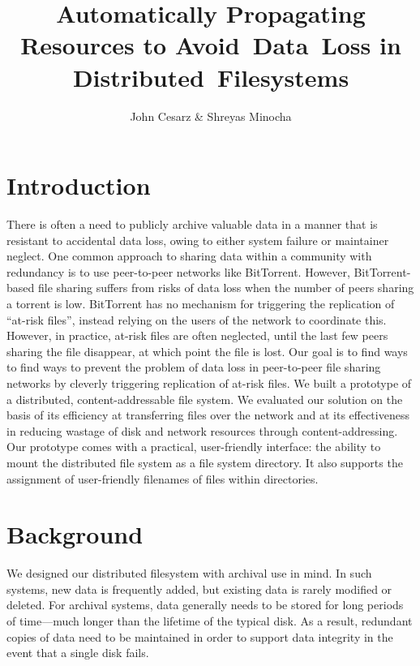 \documentclass[twocolumn]{article}
\title{Automatically Propagating Resources to Avoid~Data~Loss in Distributed~Filesystems}
\author{John Cesarz \& Shreyas Minocha}
\begin{document}
\maketitle

\section{Introduction}

There is often a need to publicly archive valuable data in a manner that is resistant to accidental data loss, owing to either system failure or maintainer neglect.
%
One common approach to sharing data within a community with redundancy is to use peer-to-peer networks like BitTorrent.
However, BitTorrent-based file sharing suffers from risks of data loss when the number of peers sharing a torrent is low.
BitTorrent has no mechanism for triggering the replication of ``at-risk files'', instead relying on the users of the network to coordinate this.
However, in practice, at-risk files are often neglected, until the last few peers sharing the file disappear, at which point the file is lost.
%
Our goal is to find ways to find ways to prevent the problem of data loss in peer-to-peer file sharing networks by cleverly triggering replication of at-risk files.
We built a prototype of a distributed, content-addressable file system.
We evaluated our solution on the basis of its efficiency at transferring files over the network and at its effectiveness in reducing wastage of disk and network resources through content-addressing.
Our prototype comes with a practical, user-friendly interface: the ability to mount the distributed file system as a file system directory.
It also supports the assignment of user-friendly filenames of files within directories.

\section{Background}

We designed our distributed filesystem with archival use in mind.
In such systems, new data is frequently added, but existing data is rarely modified or deleted.
For archival systems, data generally needs to be stored for long periods of time—much longer than the lifetime of the typical disk.
As a result, redundant copies of data need to be maintained in order to support data integrity in the event that a single disk fails.
\end{document}
